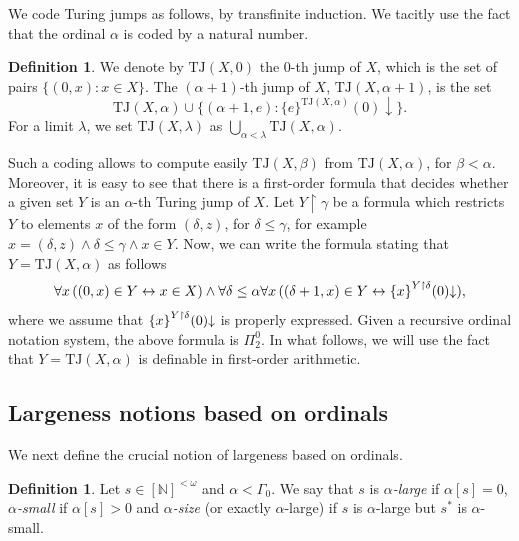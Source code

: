 \documentclass[11pt]{amsart}
\theoremstyle{definition}
\newtheorem{definition}[thm]{Definition}
\theoremstyle{remark}
\theoremstyle{plain}
\newcommand{\numberset}{\mathbb}
\newcommand{\N}{\numberset{N}}
\def\om{\omega}
\def\a{\alpha}
\def\G{\Gamma}
\def\d{\delta}
\newcommand{\TJ}{\mathsf{TJ}}
\def\TJ{{\textrm{TJ}}}
\newcommand{\set}[1]{{\{{#1}\}}}
\def\stops{{\downarrow}}
\def\N{{\mathbb{N}}}
\def\stops{{\downarrow}}
\begin{document}
We code Turing jumps as follows, by transfinite induction.
We tacitly use the fact that the ordinal $\a$ is coded by a natural number.

\begin{definition}\label{dfn:TuringJump}
We denote by $\TJ(X,0)$ the $0$-th jump of $X$, which is the set of pairs $\set{(0,x)\colon x\in X}$.
The $(\alpha+1)$-th jump of $X$, $\TJ(X,\alpha+1)$, is the set 
$$\TJ(X,\alpha)\cup\set{(\alpha+1,e)\colon \set{e}^{\TJ(X,\alpha)}(0)\downarrow }.$$
For a limit $\lambda$, we set $\TJ(X,\lambda)$ as $\bigcup_{\alpha<\lambda}\TJ(X,\alpha)$.
\end{definition} 

Such a coding allows to compute easily $\TJ(X,\beta)$ from $\TJ(X,\alpha)$, for $\beta<\alpha$.
Moreover, it is easy to see that there is a first-order formula that decides whether a given set $Y$ is an $\alpha$-th Turing jump of $X$.
Let $Y\restriction \gamma$ be a formula which restricts $Y$ to elements $x$ of the form $(\delta,z)$, for $\delta\le\gamma$, for example $x=(\delta,z)\land \d \le \gamma \land x \in Y$.
Now, we can write the formula stating that $Y=\TJ(X,\alpha)$ as follows 
$$\forall x\,((0,x)\in Y \leftrightarrow x\in X)\land
\forall \delta\le \a\forall x\,((\delta+1,x)\in Y \leftrightarrow \set{x}\sp{Y\restriction\delta}(0)\stops),$$
where we assume that $\set{x}\sp{Y\restriction\delta}(0)\stops$ is properly expressed.
Given a recursive ordinal notation system, the above formula is $\Pi^0_2$. In what follows, we will use the fact that $Y=\TJ(X,\alpha)$ is definable in first-order arithmetic. 

%
%

\subsection{Largeness notions based on ordinals}\label{subsec: largeness}

%
%

We next define the crucial notion of largeness based on ordinals. 

\begin{definition}\label{defi:largeness}
Let $s \in [\N]^{< \om}$ and $\a < \G_0$.
We say that $s$ is \textit{$\a$-large} if $\a[s] = 0$, \textit{$\a$-small} if $\a[s] > 0$ and \textit{$\a$-size} (or exactly $\a$-large) if $s$ is $\a$-large but $s^*$ is $\a$-small.
\end{definition}
\end{document}
